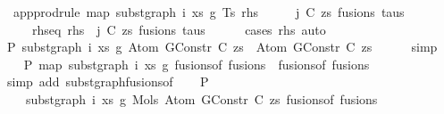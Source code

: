 \begin{isabellebody}
\ \ app{\isacharunderscore}{\kern0pt}prodrule\ {\isacharparenleft}{\kern0pt}map\ {\isacharparenleft}{\kern0pt}subst{\isacharunderscore}{\kern0pt}graph\ i\ xs\ g{}{\isacharparenright}{\kern0pt}\ Ts{\isacharparenright}{\kern0pt}\ rhs{\isachardoublequoteclose}\isanewline
%
\isadelimproof
%
\endisadelimproof
%
\isatagproof
{}\isamarkupfalse%
\ {\isacharminus}{\kern0pt}\isanewline
\ \ \isamarkupfalse%
\ j\ C\ zs\ fusions\ taus\isanewline
\ \ \ \ \ rhs{\isacharunderscore}{\kern0pt}eq{\isacharcolon}{\kern0pt}\ {\isachardoublequoteopen}rhs\ {\isacharequal}{\kern0pt}\ {\isacharparenleft}{\kern0pt}j{\isacharcomma}{\kern0pt}\ {\isacharparenleft}{\kern0pt}C{\isacharcomma}{\kern0pt}\ zs{\isacharparenright}{\kern0pt}{\isacharcomma}{\kern0pt}\ fusions{\isacharcomma}{\kern0pt}\ taus{\isacharparenright}{\kern0pt}{\isachardoublequoteclose}\isanewline
\ \ \ \ \isamarkupfalse%
\ {\isacharparenleft}{\kern0pt}cases\ rhs{\isacharparenright}{\kern0pt}\ auto\isanewline
\isanewline
\ \ \isamarkupfalse%
\ P{}{\isacharcolon}{\kern0pt}\ {\isachardoublequoteopen}subst{\isacharunderscore}{\kern0pt}graph\ i\ xs\ g{}\ {\isacharparenleft}{\kern0pt}Atom\ {\isacharparenleft}{\kern0pt}GConstr\ C{\isacharparenright}{\kern0pt}\ zs{\isacharparenright}{\kern0pt}\ {\isacharequal}{\kern0pt}\ Atom\ {\isacharparenleft}{\kern0pt}GConstr\ C{\isacharparenright}{\kern0pt}\ zs{\isachardoublequoteclose}\isanewline
\ \ \ \ \isamarkupfalse%
\ simp\isanewline
\isanewline
\ \ \isamarkupfalse%
\ P{}{\isacharcolon}{\kern0pt}\ {\isachardoublequoteopen}map\ {\isacharparenleft}{\kern0pt}subst{\isacharunderscore}{\kern0pt}graph\ i\ xs\ g{}{\isacharparenright}{\kern0pt}\ {\isacharparenleft}{\kern0pt}fusions{\isacharunderscore}{\kern0pt}of\ fusions{\isacharparenright}{\kern0pt}\ {\isacharequal}{\kern0pt}\ fusions{\isacharunderscore}{\kern0pt}of\ fusions{\isachardoublequoteclose}\isanewline
\ \ \ \ \isamarkupfalse%
\ {\isacharparenleft}{\kern0pt}simp\ add{\isacharcolon}{\kern0pt}\ subst{\isacharunderscore}{\kern0pt}graph{\isacharunderscore}{\kern0pt}fusions{\isacharunderscore}{\kern0pt}of{\isacharparenright}{\kern0pt}\isanewline
\isanewline
\ \ \isamarkupfalse%
\ P{}{\isacharcolon}{\kern0pt}\isanewline
\ \ \ \ {\isachardoublequoteopen}subst{\isacharunderscore}{\kern0pt}graph\ i\ xs\ g{}\ {\isacharparenleft}{\kern0pt}Mols{}\ {\isacharparenleft}{\kern0pt}Atom\ {\isacharparenleft}{\kern0pt}GConstr\ C{\isacharparenright}{\kern0pt}\ zs{\isacharparenright}{\kern0pt}\ {\isacharparenleft}{\kern0pt}fusions{\isacharunderscore}{\kern0pt}of\ fusions{\isacharparenright}{\kern0pt}{\isacharparenright}{\kern0pt}\ {\isacharequal}{\kern0pt}\isanewline

\end{isabellebody}
